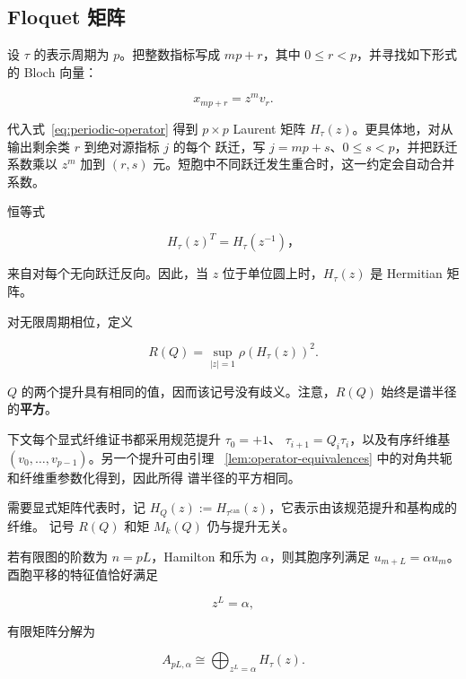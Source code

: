 \subsection{Floquet 矩阵}\label{subsec:floquet-matrices}

设 \(\tau\) 的表示周期为 \(p\)。把整数指标写成 \(mp+r\)，其中
\(0\leq r<p\)，并寻找如下形式的 Bloch 向量：

\begin{equation}
x_{mp+r}=z^m v_r.
\end{equation}

代入式~\eqref{eq:periodic-operator} 得到 \(p\times p\) Laurent 矩阵
\(H_\tau(z)\)。更具体地，对从输出剩余类 \(r\) 到绝对源指标 \(j\) 的每个
跃迁，写 \(j=mp+s\)、\(0\leq s<p\)，并把跃迁系数乘以 \(z^m\) 加到
\((r,s)\) 元。短胞中不同跃迁发生重合时，这一约定会自动合并系数。

恒等式

\begin{equation}
\label{eq:fiber-transpose}
H_\tau(z)^T=H_\tau(z^{-1})\text{，}
\end{equation}

来自对每个无向跃迁反向。因此，当 \(z\) 位于单位圆上时，\(H_\tau(z)\) 是
Hermitian 矩阵。

对无限周期相位，定义

\begin{equation}
\label{eq:squared-periodic-radius}
R(Q)=\sup_{\lvert z\rvert=1} \rho(H_\tau(z))^{2}.
\end{equation}

\(Q\) 的两个提升具有相同的值，因而该记号没有歧义。注意，\(R(Q)\)
始终是谱半径的\textbf{平方}。

下文每个显式纤维证书都采用规范提升 \(\tau_0=+1\)、
\(\tau_{i+1}=Q_i\tau_i\)，以及有序纤维基
\((v_0,\ldots,v_{p-1})\)。另一个提升可由引理~
\ref{lem:operator-equivalences} 中的对角共轭和纤维重参数化得到，因此所得
谱半径的平方相同。

需要显式矩阵代表时，记
\(H_Q(z):=H_{\tau^{\mathrm{can}}}(z)\)，它表示由该规范提升和基构成的纤维。
记号 \(R(Q)\) 和矩 \(M_k(Q)\) 仍与提升无关。

若有限图的阶数为 \(n=pL\)，Hamilton 和乐为 \(\alpha\)，则其胞序列满足
\(u_{m+L}=\alpha u_m\)。酉胞平移的特征值恰好满足

\begin{equation}
\label{eq:finite-bloch-grid}
z^L=\alpha,
\end{equation}

有限矩阵分解为

\begin{equation}
\label{eq:finite-floquet-decomposition}
A_{pL,\alpha}  \cong  \bigoplus_{z^L=\alpha} H_\tau(z).
\end{equation}

